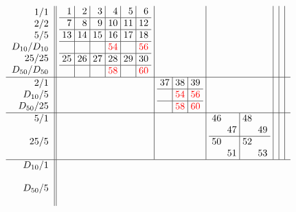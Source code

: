 \documentclass[11pt,a4paper]{amsart}
\begin{document}
\begin{align*}\arraycolsep3pt
  \begin{array}{r||c|c|c|c|c|c}
  \begin{array}{r}
1/1\\2/2\\5/5\\D_{10}/D_{10}\\25/25\\D_{50}/D_{50}\\
  \end{array}
   &
\begin{array}{r|r|r|r|r|r}
1&2&3&4&5&6\\ \hline
7&8&9&10&11&12\\ \hline
13&14&15&16&17&18\\ \hline
&&&\textcolor{red}{54}&&\textcolor{red}{56}\\ \hline
25&26&27&28&29&30\\ \hline
&&&\textcolor{red}{58}&&\textcolor{red}{60}\\
\end{array}
&&&&& \\ \hline
    \begin{array}{r}
2/1\\D_{10}/5\\D_{50}/25\\
    \end{array}
    &&
\begin{array}{r|r|r}%
37&38&39\\ \hline
&\textcolor{red}{54}&\textcolor{red}{56}\\ \hline
&\textcolor{red}{58}&\textcolor{red}{60}\\
\end{array}
&&&& \\ \hline
    \begin{array}{r}
5/1\\ \\25/5\\ \\
    \end{array}
    &&&
\begin{array}{rr|rr}%
46&&48&\\
&47&&49\\ \hline
50&&52&\\
&51&&53
\end{array}%
&&& \\ \hline
    \begin{array}{r}
D_{10}/1\\ \\D_{50}/5\\ \\

\end{array}
\end{array}
\end{align*}
\end{document}
